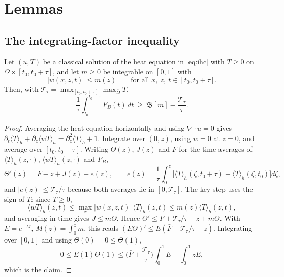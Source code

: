 \section{Lemmas}\label{sec:lemmas}

\subsection{The integrating-factor inequality}

\begin{lemma}\label{lem:IF}
Let $(u,T)$ be a classical solution of the heat equation in \eqref{eq:ihc} with $T\ge0$ on
$\overline\Omega\times[t_0,t_0+\tau]$, and let $m\ge0$ be integrable on $[0,1]$ with
\[
|w(x,z,t)|\le m(z)\qquad\text{for all } x,\ z,\ t\in[t_0,t_0+\tau].
\]
Then, with $\mathcal T_\tau=\max_{[t_0,t_0+\tau]}\max_{\overline\Omega}T$,
\[
\frac1\tau\int_{t_0}^{t_0+\tau}F_B(t)\,dt\ \ge\ \mathfrak B[m]-\frac{\mathcal T_\tau}{\tau}.
\]
\end{lemma}

\begin{proof}
Averaging the heat equation horizontally and using $\nabla\cdot u=0$ gives
$\partial_t\langle T\rangle_h+\partial_z\langle wT\rangle_h=\partial_z^2\langle T\rangle_h+1$. Integrate over
$(0,z)$, using $w=0$ at $z=0$, and average over $[t_0,t_0+\tau]$. Writing $\Theta(z)$, $J(z)$ and $\bar F$
for the time averages of $\langle T\rangle_h(z,\cdot)$, $\langle wT\rangle_h(z,\cdot)$ and $F_B$,
\begin{equation}\label{eq:balance}
\Theta'(z)=\bar F-z+J(z)+e(z),\qquad
e(z)=\frac1\tau\int_0^z\big[\langle T\rangle_h(\zeta,t_0+\tau)-\langle T\rangle_h(\zeta,t_0)\big]d\zeta,
\end{equation}
and $|e(z)|\le\mathcal T_\tau/\tau$ because both averages lie in $[0,\mathcal T_\tau]$.
The key step uses the sign of $T$: since $T\ge0$,
\[
\langle wT\rangle_h(z,t)\le \max_x|w(x,z,t)|\,\langle T\rangle_h(z,t)\le m(z)\langle T\rangle_h(z,t),
\]
and averaging in time gives $J\le m\Theta$. Hence $\Theta'\le \bar F+\mathcal T_\tau/\tau-z+m\Theta$. With
$E=e^{-M}$, $M(z)=\int_0^zm$, this reads $(E\Theta)'\le E(\bar F+\mathcal T_\tau/\tau-z)$. Integrating over
$[0,1]$ and using $\Theta(0)=0\le\Theta(1)$,
\[
0\le E(1)\Theta(1)\le\Big(\bar F+\frac{\mathcal T_\tau}{\tau}\Big)\int_0^1E-\int_0^1zE,
\]
which is the claim.
\end{proof}

